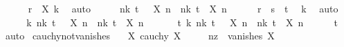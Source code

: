 \begin{isabellebody}
\ \ \ \ \isamarkupfalse%
\ {\isacartoucheopen}r\ {\isasymle}\ {\isasymbar}X\ k{\isasymbar}{\isacartoucheclose}\ \isamarkupfalse%
\ auto\isanewline
\ \ \isamarkupfalse%
\ \isamarkupfalse%
\ {\isachardoublequoteopen}{\isacharparenleft}{\kern0pt}{\isasymforall}n{\isasymge}k{\isachardot}{\kern0pt}\ t\ {\isacharless}{\kern0pt}\ {\isacharminus}{\kern0pt}\ X\ n{\isacharparenright}{\kern0pt}\ {\isasymor}\ {\isacharparenleft}{\kern0pt}{\isasymforall}n{\isasymge}k{\isachardot}{\kern0pt}\ t\ {\isacharless}{\kern0pt}\ X\ n{\isacharparenright}{\kern0pt}{\isachardoublequoteclose}\isanewline
\ \ \ \ \isamarkupfalse%
\ {\isacartoucheopen}r\ {\isacharequal}{\kern0pt}\ s\ {\isacharplus}{\kern0pt}\ t{\isacartoucheclose}\ \isamarkupfalse%
\ k\ \isamarkupfalse%
\ auto\isanewline
\ \ \isamarkupfalse%
\ \isamarkupfalse%
\ {\isachardoublequoteopen}{\isasymexists}k{\isachardot}{\kern0pt}\ {\isacharparenleft}{\kern0pt}{\isasymforall}n{\isasymge}k{\isachardot}{\kern0pt}\ t\ {\isacharless}{\kern0pt}\ {\isacharminus}{\kern0pt}\ X\ n{\isacharparenright}{\kern0pt}\ {\isasymor}\ {\isacharparenleft}{\kern0pt}{\isasymforall}n{\isasymge}k{\isachardot}{\kern0pt}\ t\ {\isacharless}{\kern0pt}\ X\ n{\isacharparenright}{\kern0pt}{\isachardoublequoteclose}\ \isacommand{{\isachardot}{\kern0pt}{\isachardot}{\kern0pt}}\isamarkupfalse%
\isanewline
\ \ \isamarkupfalse%
\ \isamarkupfalse%
\ {\isachardoublequoteopen}{\isasymexists}t{\isachargreater}{\kern0pt}{}{\isachardot}{\kern0pt}\ {\isasymexists}k{\isachardot}{\kern0pt}\ {\isacharparenleft}{\kern0pt}{\isasymforall}n{\isasymge}k{\isachardot}{\kern0pt}\ t\ {\isacharless}{\kern0pt}\ {\isacharminus}{\kern0pt}\ X\ n{\isacharparenright}{\kern0pt}\ {\isasymor}\ {\isacharparenleft}{\kern0pt}{\isasymforall}n{\isasymge}k{\isachardot}{\kern0pt}\ t\ {\isacharless}{\kern0pt}\ X\ n{\isacharparenright}{\kern0pt}{\isachardoublequoteclose}\isanewline
\ \ \ \ \isamarkupfalse%
\ t\ \isamarkupfalse%
\ auto\isanewline
{}\isamarkupfalse%
%
\endisatagproof
{\isafoldproof}%
%
\isadelimproof
\isanewline
%
\endisadelimproof
\isanewline
{}\isamarkupfalse%
\ cauchy{\isacharunderscore}{\kern0pt}not{\isacharunderscore}{\kern0pt}vanishes{\isacharcolon}{\kern0pt}\isanewline
\ \ \ X{\isacharcolon}{\kern0pt}\ {\isachardoublequoteopen}cauchy\ X{\isachardoublequoteclose}\isanewline
\ \ \ \ \ nz{\isacharcolon}{\kern0pt}\ {\isachardoublequoteopen}{\isasymnot}\ vanishes\ X{\isachardoublequoteclose}\isanewline

\end{isabellebody}
